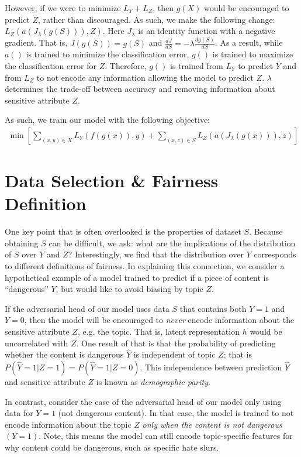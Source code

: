 \documentclass[sigconf,9pt]{acmart}
\begin{document}
However, if we were to minimize $L_Y + L_Z$, then $g(X)$ would be encouraged to predict $Z$, rather than discouraged.  As such, we make the following change: $L_Z(a(J_\lambda(g(S))), Z)$.  Here $J_\lambda$ is an identity function with a negative gradient.  That is, $J(g(S)) = g(S)$ and  $\frac{dJ}{dS} = -\lambda \frac{d g(S)}{dS}$.   As a result, while $a()$ is trained to minimize the classification error, $g()$ is trained to maximize the classification error for $Z$.
Therefore, $g()$ is trained from $L_Y$ to predict $Y$ and from $L_Z$ to not encode any information allowing the model to predict $Z$.
$\lambda$ determines the trade-off between accuracy and removing information about sensitive attribute $Z$.
 
As such, we train our model with the following objective:
\begin{align}
    \min \left[\sum_{(x,y) \in X} L_Y(f(g(x)), y) + \sum_{(x,z) \in S} L_Z(a(J_\lambda(g(x))), z)\right]
\end{align} 


\section{Data Selection \& Fairness Definition}
\label{sec:datadef}

One key point that is often overlooked is the properties of dataset $S$.
Because obtaining $S$ can be difficult, we ask: what are the implications of the distribution of $S$ over $Y$ and $Z$?  Interestingly, we find that the distribution over $Y$ corresponds to different definitions of fairness.
In explaining this connection, we consider a hypothetical example of a model trained to predict if a piece of content is ``dangerous'' $Y$, but would like to avoid biasing by topic $Z$.  
 
If the adversarial head of our model uses data $S$ that contains both $Y=1$ and $Y=0$, then the model will be encouraged to \emph{never} encode information about the sensitive attribute $Z$, e.g. the topic.  That is, latent representation $h$ would be uncorrelated with $Z$.  One result of that is that the probability of predicting whether the content is dangerous $\hat{Y}$ is independent of topic $Z$; that is $P(\hat{Y} = 1 | Z = 1) = P(\hat{Y} = 1 | Z=0)$.  This independence between prediction $\hat{Y}$ and sensitive attribute $Z$ is known as \emph{demographic parity}.

In contrast, consider the case of the adversarial head of our model only using data for $Y=1$ (not dangerous content).  In that case, the model is trained to not encode information about the topic $Z$ \emph{only when the content is not dangerous} $(Y=1)$.  Note, this means the model can still encode topic-specific features for why content could be dangerous, such as specific hate slurs.
\end{document}
